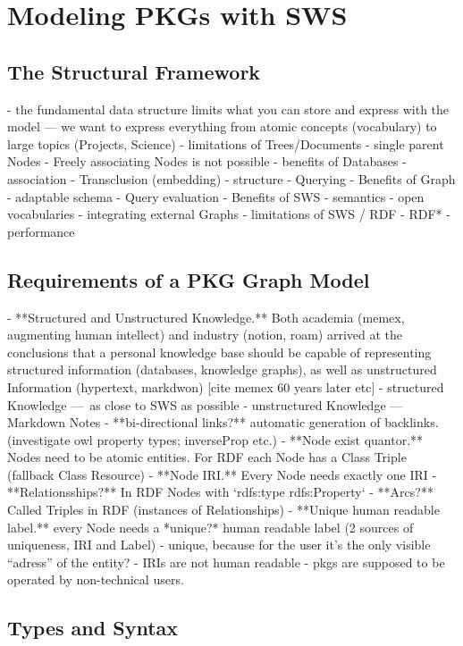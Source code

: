 \chapter{Modeling PKGs with SWS}
\section{The Structural Framework}

- the fundamental data structure limits what you can store and express with the model — we want to express everything from atomic concepts (vocabulary) to large topics (Projects, Science)
- limitations of Trees/Documents
    - single parent Nodes
    - Freely associating Nodes is not possible
- benefits of Databases
    - association
    - Transclusion (embedding)
    - structure
    - Querying
- Benefits of Graph
    - adaptable schema
    - Query evaluation
- Benefits of SWS
    - semantics
    - open vocabularies
    - integrating external Graphs
- limitations of SWS / RDF
    - RDF*
    - performance
\section{Requirements of a PKG Graph Model}

- **Structured and Unstructured Knowledge.** Both academia (memex, augmenting human intellect) and industry (notion, roam) arrived at the conclusions that a personal knowledge base should be capable of representing structured information (databases, knowledge graphs), as well as unstructured Information (hypertext, markdwon) [cite memex 60 years later etc]
    - structured Knowledge — as close to SWS as possible
    - unstructured Knowledge — Markdown Notes
- **bi-directional links?** automatic generation of backlinks. (investigate owl property types; inverseProp etc.)
- **Node exist quantor.** Nodes need to be atomic entities. For RDF each Node has a Class Triple (fallback Class Resource)
- **Node IRI.** Every Node needs exactly one IRI
- **Relationsships?** In RDF Nodes with `rdfs:type rdfs:Property`
- **Arcs?** Called Triples in RDF (instances of Relationships)
- **Unique human readable label.** every Node needs a *unique?* human readable label (2 sources of uniqueness, IRI and Label)
    - unique, because for the user it’s the only visible “adress” of the entity?
    - IRIs are not human readable
    - pkgs are supposed to be operated by non-technical users.
\section{Types and Syntax}

